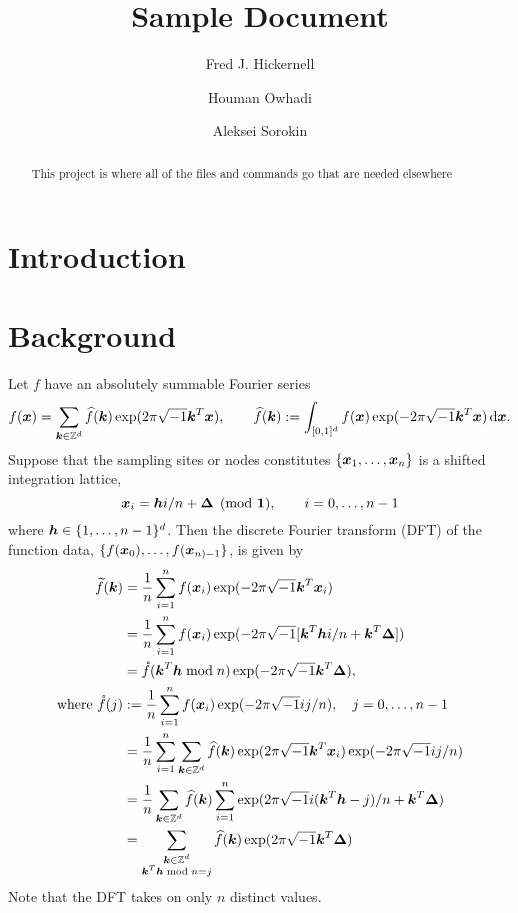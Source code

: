 \documentclass{amsart}
\begin{document}
\title{Sample Document}
\author{Fred J. Hickernell}
\author{Houman Owhadi}
\author{Aleksei Sorokin}
\begin{abstract}This project is where all of the files and commands go that are needed elsewhere
\end{abstract}

\maketitle

\section{Introduction}

\section{Background}
Let $f$ have an absolutely summable Fourier series
\begin{equation*}
    f(\boldsymbol{x}) = \sum_{\boldsymbol{k} \in \mathbb{Z}^d} \widehat{f}(\boldsymbol{k}) \exp(2 \pi \sqrt{-1} \boldsymbol{k}^T \boldsymbol{x}), \qquad \widehat{f}(\boldsymbol{k}) : = \int_{[0,1]^d} f(\boldsymbol{x})  \exp(-2 \pi \sqrt{-1} \boldsymbol{k}^T \boldsymbol{x}) \, {\rm d} \boldsymbol{x}.
\end{equation*}
Suppose that the sampling sites or nodes constitutes $\{ \boldsymbol{x}_1, \ldots, \boldsymbol{x}_n\}$ is a shifted integration lattice, 
\begin{equation} \label{eq:shift_lat}
    \boldsymbol{x}_i = \boldsymbol{h} i /n + \boldsymbol{\Delta} \pmod {\boldsymbol{1}}, \qquad i = 0, \ldots, n - 1
\end{equation}
where $\boldsymbol{h} \in \{1, \ldots, n-1\}^d$.  Then the discrete Fourier transform (DFT) of the function data, $\{ f(\boldsymbol{x}_0), \ldots, f(\boldsymbol{x}_{n)-1}\}$, is given by 
\begin{align*}
    \widetilde{f}(\boldsymbol{k}) &= \frac 1n \sum_{i=1}^n f(\boldsymbol{x}_i) \exp(-2 \pi \sqrt{-1} \boldsymbol{k}^T \boldsymbol{x}_i) \\
    & = \frac 1n \sum_{i=1}^n f(\boldsymbol{x}_i) \exp(-2 \pi \sqrt{-1} [\boldsymbol{k}^T\boldsymbol{h} i/n + \boldsymbol{k}^T\boldsymbol{\Delta}]) \\
    & = \mathring{f}(\boldsymbol{k}^T \boldsymbol{h} \bmod n) \exp(-2 \pi \sqrt{-1} \boldsymbol{k}^T\boldsymbol{\Delta}), \\
    \text{where } 
    \mathring{f}(j) &: = \frac 1n \sum_{i=1}^n f(\boldsymbol{x}_i) \exp(-2 \pi \sqrt{-1} ij/n), \quad  j = 0, \ldots, n-1 \\
    & = \frac 1n \sum_{i=1}^n \sum_{\boldsymbol{k} \in \mathbb{Z}^d} \widehat{f}(\boldsymbol{k}) \exp(2 \pi \sqrt{-1} \boldsymbol{k}^T \boldsymbol{x}_i) \exp(-2 \pi \sqrt{-1} ij/n) \\
    & = \frac 1n \sum_{\boldsymbol{k} \in \mathbb{Z}^d} \widehat{f}(\boldsymbol{k}) \sum_{i=1}^n \exp(2 \pi \sqrt{-1} i (\boldsymbol{k}^T \boldsymbol{h} - j) /n + \boldsymbol{k}^T \boldsymbol{\Delta}) \\
    & = \sum_{\substack{\boldsymbol{k} \in \mathbb{Z}^d \\ \boldsymbol{k}^T \boldsymbol{h} \bmod n = j}} \widehat{f}(\boldsymbol{k}) \exp(2 \pi \sqrt{-1} \boldsymbol{k}^T \boldsymbol{\Delta}) \\
\end{align*}
Note that the DFT takes on only $n$ distinct values. 
\end{document}
